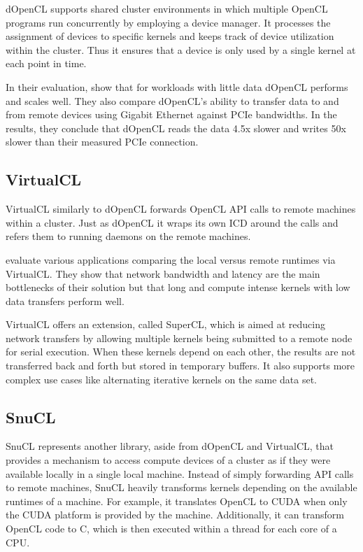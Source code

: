 dOpenCL supports shared cluster environments in which multiple OpenCL programs run concurrently by employing a device manager. It processes the assignment of devices to specific kernels and keeps track of device utilization within the cluster. Thus it ensures that a device is only used by a single kernel at each point in time.

In their evaluation, \citeauthor{dopencl} show that for workloads with little data dOpenCL performs and scales well. They also compare dOpenCL's ability to transfer data to and from remote devices using Gigabit Ethernet against PCIe bandwidths. In the results, they conclude that dOpenCL reads the data 4.5x slower and writes 50x slower than their measured PCIe connection.

\subsection*{VirtualCL}

VirtualCL similarly to dOpenCL forwards OpenCL API calls to remote machines within a cluster\cite{virtualcl}. Just as dOpenCL it wraps its own ICD around the calls and refers them to running daemons on the remote machines.

\citeauthor{virtualcl} evaluate various applications comparing the local versus remote runtimes via VirtualCL. They show that network bandwidth and latency are the main bottlenecks of their solution but that long and compute intense kernels with low data transfers perform well.

VirtualCL offers an extension, called SuperCL, which is aimed at reducing network transfers by allowing multiple kernels being submitted to a remote node for serial execution. When these kernels depend on each other, the results are not transferred back and forth but stored in temporary buffers. It also supports more complex use cases like alternating iterative kernels on the same data set.

\subsection*{SnuCL}

SnuCL represents another library, aside from dOpenCL and VirtualCL, that provides a mechanism to access compute devices of a cluster as if they were available locally in a single local machine\cite{snucl}. Instead of simply forwarding API calls to remote machines, SnuCL heavily transforms kernels depending on the available runtimes of a machine. For example, it translates OpenCL to CUDA when only the CUDA platform is provided by the machine. Additionally, it can transform OpenCL code to C, which is then executed within a thread for each core of a CPU.

